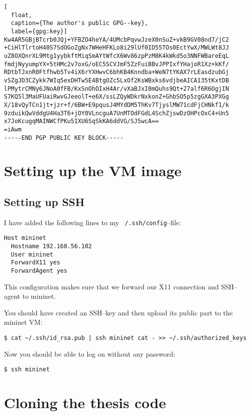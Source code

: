 \begin{lstlisting}[
  float,
  caption={The author's public GPG--key},
  label={gpg:key}]
Kw4AR5GBjBTcrb0JQj+YFBZO4heYA/4UMcbPqvwJzeX0nSuZ+vkB9GV08nd7/jC2
+CiHlTlrtoH40S7SdOGoZgNx7WHeHFKLo8i29lUf0ID55TOs0EctYwX/MWLWt8JJ
uZ8OXQnrXL9Mtg1yybkftMiqSmAYtWfcX6Wv86zpPzM8K4kWkd5o3NNFWBareEqL
fmdjNyyumpYX+5tHMc2v7oxG/oEC5SCVJmF5ZzFuiBBvJPPIxfYHajoR1Xz+kKf/
RDtbTJxnR0Ftfhwb5Tv4iX6rYXHwvC6bhKB4Knndba+WeN7tYKAX7rLEasdzubGj
vSZgJD3CZykk7WIq5exDHTw5E4BtgOZc5LxOf2KsWBxks6vdjbeAICA135tKxtDB
lPMytrCMNy6JNoA0fFB/KxSnOhOIxH4Ar/vXaBJxI0mQuhs9Qt+27alf6R6OgjIN
S7KQ5l3MaUFUaiRwvGJeeolT+e6X/ssLZQyWDkrNxkonZ+GhbSO5p5zgGXA3PXGg
X/18vQyTCn1jt+jzr+f/6BW+E9pqusJ4MYdDM5ThKv7TjyslMW71cdFjCHNkf1/k
9zduikQwVddgU4Ha3T6+jOY0VLncguA7UnMTOdFGdL4SchZjswDzOHPcOxC4+Un5
x7JoKcugqMAINWCfPKu5IXU6SqSkKA6ddVG/SJ5wcA==
=iAwm
-----END PGP PUBLIC KEY BLOCK-----
\end{lstlisting}
\clearpage %

\section{Setting up the VM image}


\subsection{Setting up SSH}

I have added the following lines to my \texttt{~/.ssh/config}--file:

\begin{verbatim}
Host mininet
  Hostname 192.168.56.102
  User mininet
  ForwardX11 yes
  ForwardAgent yes
\end{verbatim}

This configuration makes sure that we forward our X11 connection and
SSH--agent to mininet.

You should have created an SSH--key and then upload its public part to the
mininet VM:

\begin{verbatim}
$ cat ~/.ssh/id_rsa.pub | ssh mininet cat - >> ~/.ssh/authorized_keys
\end{verbatim}

Now you should be able to log on without any password:

\begin{verbatim}
$ ssh mininet
\end{verbatim}

\section{Cloning the thesis code}

